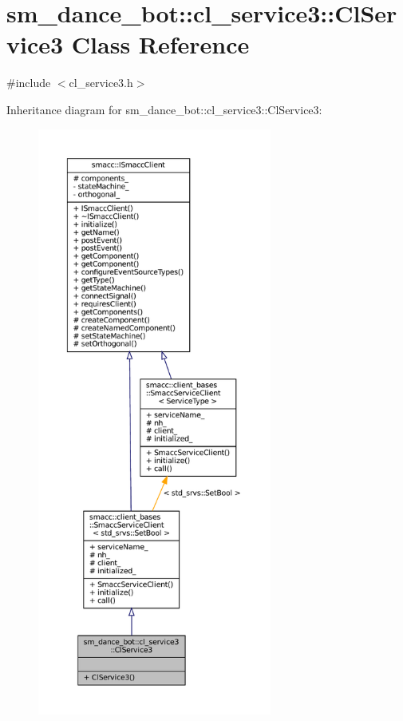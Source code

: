 \hypertarget{classsm__dance__bot_1_1cl__service3_1_1ClService3}{}\section{sm\+\_\+dance\+\_\+bot\+:\+:cl\+\_\+service3\+:\+:Cl\+Service3 Class Reference}
\label{classsm__dance__bot_1_1cl__service3_1_1ClService3}


{\ttfamily \#include $<$cl\+\_\+service3.\+h$>$}



Inheritance diagram for sm\+\_\+dance\+\_\+bot\+:\+:cl\+\_\+service3\+:\+:Cl\+Service3\+:
\nopagebreak
\begin{figure}[H]
\begin{center}
\leavevmode
\includegraphics[height=550pt]{classsm__dance__bot_1_1cl__service3_1_1ClService3__inherit__graph}
\end{center}
\end{figure}


